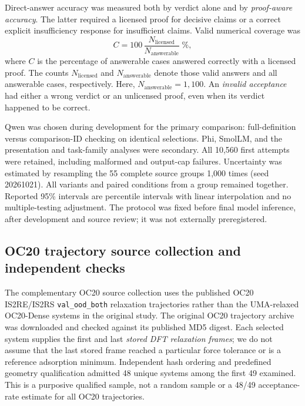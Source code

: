 Direct-answer accuracy was measured both by verdict alone and by \emph{proof-aware accuracy}. The latter required a licensed proof for decisive claims or a correct explicit insufficiency response for insufficient claims. Valid numerical coverage was
\begin{equation}
 C=100\,\frac{N_{\mathrm{licensed}}}{N_{\mathrm{answerable}}}\;\%,
 \label{eq:coverage}
\end{equation}
where $C$ is the percentage of answerable cases answered correctly with a licensed proof. The counts $N_{\mathrm{licensed}}$ and $N_{\mathrm{answerable}}$ denote those valid answers and all answerable cases, respectively. Here, $N_{\mathrm{answerable}}=1{,}100$. An \emph{invalid acceptance} had either a wrong verdict or an unlicensed proof, even when its verdict happened to be correct.

Qwen was chosen during development for the primary comparison: full-definition versus comparison-ID checking on identical selections. Phi, SmolLM, and the presentation and task-family analyses were secondary. All 10,560 first attempts were retained, including malformed and output-cap failures. Uncertainty was estimated by resampling the 55 complete source groups 1,000 times (seed 20261021). All variants and paired conditions from a group remained together. Reported 95\% intervals are percentile intervals with linear interpolation and no multiple-testing adjustment. The protocol was fixed before final model inference, after development and source review; it was not externally preregistered.

\subsection{OC20 trajectory source collection and independent checks}
\label{sec:external_methods}

The complementary OC20 source collection uses the published OC20 IS2RE/IS2RS \texttt{val\_ood\_both} relaxation trajectories rather than the UMA-relaxed OC20-Dense systems in the original study.\cite{chanussot2021open} The original OC20 trajectory archive was downloaded and checked against its published MD5 digest. Each selected system supplies the first and last \emph{stored DFT relaxation frames}; we do not assume that the last stored frame reached a particular force tolerance or is a reference adsorption minimum. Independent hash ordering and predefined geometry qualification admitted 48 unique systems among the first 49 examined. This is a purposive qualified sample, not a random sample or a 48/49 acceptance-rate estimate for all OC20 trajectories.

